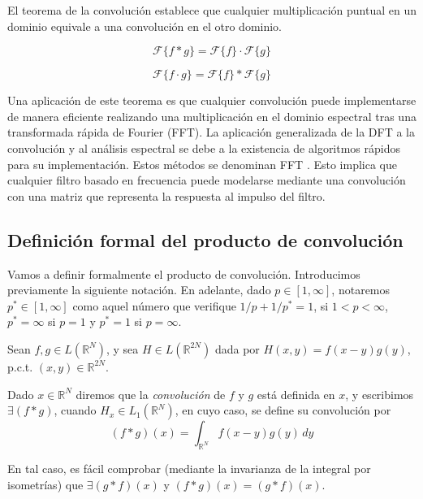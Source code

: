 El teorema de la convolución establece que cualquier multiplicación puntual en un dominio equivale a una convolución en el otro dominio.

\begin{equation}
\mathcal{F}\{f * g\} = \mathcal{F}\{f\} \cdot \mathcal{F}\{g\} \tag{1.11}
\end{equation}

\begin{equation}
\mathcal{F}\{f \cdot g\} = \mathcal{F}\{f\} * \mathcal{F}\{g\} \tag{1.12}
\end{equation}


Una aplicación de este teorema es que cualquier convolución puede implementarse de manera eficiente realizando una multiplicación en el dominio espectral tras una transformada rápida de Fourier (FFT). La aplicación generalizada de la DFT a la convolución y al análisis espectral se debe a la existencia de algoritmos rápidos para su implementación. Estos métodos se denominan FFT \parencite{krishna2017digital}. Esto implica que cualquier filtro basado en frecuencia puede modelarse mediante una convolución con una matriz que representa la respuesta al impulso del filtro.

\subsection{Definición formal del producto de convolución}

Vamos a definir formalmente el producto de convolución. Introducimos previamente la siguiente notación. En adelante, dado $p \in [1,\infty]$, notaremos $p^* \in [1,\infty]$ como aquel número que verifique $1/p + 1/p^* = 1$, si $1 < p < \infty$, $p^* = \infty$ si $p = 1$ y $p^* = 1$ si $p = \infty$.
\vspace{0.3cm}

\begin{definicion}
Sean $f, g \in L(\mathbb{R}^N)$, y sea $H \in L(\mathbb{R}^{2N})$ dada por $H(x,y) = f(x - y)g(y)$, p.c.t. $(x,y) \in \mathbb{R}^{2N}$.  

Dado $x \in \mathbb{R}^N$ diremos que la \textit{convolución} de $f$ y $g$ está definida en $x$, y escribimos $\exists(f * g)$, cuando $H_x \in L_1(\mathbb{R}^N)$, en cuyo caso, se define su convolución por
\[
(f * g)(x) = \int_{\mathbb{R}^N} f(x - y)g(y) \, dy
\]

\end{definicion}

En tal caso, es fácil comprobar (mediante la invarianza de la integral por isometrías) que $\exists(g * f)(x)$ y $(f * g)(x) = (g * f)(x)$.

